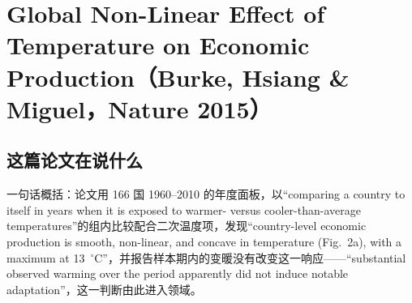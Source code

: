 
\chapter{Global Non-Linear Effect of Temperature on Economic Production（Burke, Hsiang \& Miguel，Nature 2015）}
\label{ch:burke-hsiang-miguel-2015}

\section{这篇论文在说什么}

一句话概括：论文用 166 国 1960--2010 的年度面板，以``comparing a country to itself in years when it is exposed to warmer- versus cooler-than-average temperatures''\citep[第~236 页]{burke2015global}的组内比较配合二次温度项，发现``country-level economic production is smooth, non-linear, and concave in temperature (Fig.~2a), with a maximum at 13~$^\circ$C''\citep[第~236 页]{burke2015global}，并报告样本期内的变暖没有改变这一响应——``substantial observed warming over the period apparently did not induce notable adaptation''\citep[第~237 页]{burke2015global}，这一判断由此进入领域。

